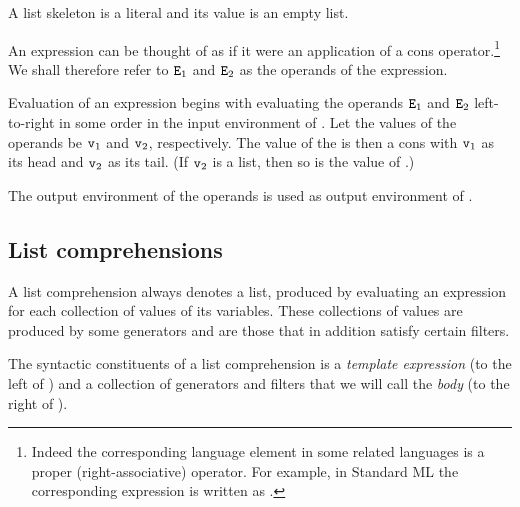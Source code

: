 A list skeleton \T{[]} is a literal and its value is an empty list.

An expression \T{[$\Z{E}_1$|$\Z{E}_2$]} can be thought of as if it
were an application of a cons operator.\footnote{Indeed the
corresponding language element in some related languages is a proper
(right-associative) operator.  For example, in Standard ML
\cite{milner+tofte+harper:revised-definition} the corresponding
expression is written as .} We shall
therefore refer to ${\tt{\sl E}}_1$ and ${\tt{\sl E}}_2$ as the operands of the
expression.

Evaluation of an expression \T{[$\Z{E}_1$|$\Z{E}_2$]} begins with
evaluating the operands ${\tt{\sl E}}_1$ and ${\tt{\sl E}}_2$
\ifStd left-to-right \fi \ifOld in some order \fi
in the
input environment of \T{[$\Z{E}_1$|$\Z{E}_2$]}.  Let the values of the
operands be ${\tt{\sl v}}_1$ and ${\tt{\sl v}}_2$, respectively.  The value of the
\T{[$\Z{E}_1$|$\Z{E}_2$]} is then a cons with ${\tt{\sl v}}_1$ as its head
and ${\tt{\sl v}}_2$ as its tail.  (If ${\tt{\sl v}}_2$ is a list, then so is the
value of \T{[$\Z{E}_1$|$\Z{E}_2$]}.)

\ENVIRONMENTS

The output environment of the operands is used as output environment
of \T{[$\Z{E}_1$|$\Z{E}_2$]}.

\subsection{List comprehensions}

\label{section:list-comprehensions}

A list comprehension always denotes a list, produced by evaluating an
expression for each collection of values of its variables.  These
collections of values are produced by some generators and are those
that in addition satisfy certain filters.

\SYNTAX

\begin{rules}
       {\TXT{[}  \TXT{||}  \TXT{]}}

       { \OR
         \TXT{,} }

       { \OR
        }

       { \TXT{<-} }

       {}
\end{rules}
The syntactic constituents of a list comprehension is a \emph{template
expression} (to the left of \T{||}) and a collection of generators and
filters that we will call the \emph{body} (to the right of \T{||}).

